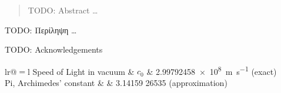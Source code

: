 \documentclass[
	12pt, %
	english, %
	onehalfspacing, %
	liststotoc, %
	toctotoc, %
	parskip, %
	headsepline, %
]{MastersDoctoralThesis} %
\begin{document}

\begin{abstract}
	\addchaptertocentry{\abstractname} %
	TODO: Abstract
	\ldots
\end{abstract}


\begin{extraAbstract}
	\addchaptertocentry{\abstractname} %
	TODO: Περίληψη
	\ldots
\end{extraAbstract}


\begin{acknowledgements}
	\addchaptertocentry{\acknowledgementname} %
	TODO: Acknowledgements
\end{acknowledgements}


\tableofcontents %
\listoffigures %
\listoftables %
\listofalgorithms %


\begin{constants}{lr@{${}={}$}l} %
	Speed of Light in vacuum & $c_{0}$ & \SI{2.99792458e8}{\meter\per\second} (exact)\\
	Pi, Archimedes' constant & \pi & 3.14159 26535 (approximation)
\end{constants}
\end{document}
